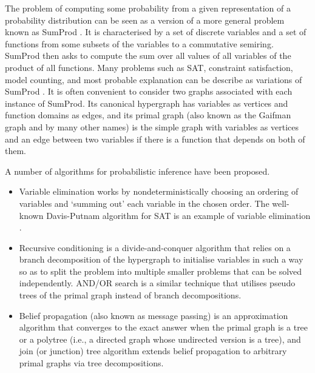 \documentclass{article}
\begin{document}
The problem of computing some probability from a given representation of a
probability distribution can be seen as a version of a more general problem
known as SumProd
\cite{DBLP:journals/jair/BacchusDP09,DBLP:journals/ai/Dechter99}. It is
characterised by a set of discrete variables and a set of functions from some
subsets of the variables to a commutative semiring. SumProd then asks to compute
the sum over all values of all variables of the product of all functions. Many
problems such as SAT, constraint satisfaction, model counting, and most probable
explanation can be describe as variations of SumProd
\cite{DBLP:journals/jair/BacchusDP09,DBLP:journals/ijar/BelleR20,DBLP:journals/ai/Dechter99,DBLP:journals/japll/KimmigBR17}.
It is often convenient to consider two graphs associated with each instance of
SumProd. Its canonical hypergraph has variables as vertices and function domains
as edges, and its primal graph (also known as the Gaifman graph and by many
other names) is the simple graph with variables as vertices and an edge
between two variables if there is a function that depends on both of them.

A number of algorithms for probabilistic inference have been proposed.
\begin{itemize}
\item Variable elimination \cite{DBLP:journals/ai/Dechter99} works by
  nondeterministically choosing an ordering of variables and `summing out' each
  variable in the chosen order. The well-known
  Davis-Putnam algorithm \cite{DBLP:journals/jacm/DavisP60} for SAT is an
  example of variable elimination \cite{DBLP:journals/jair/BacchusDP09}.
\item Recursive conditioning \cite{DBLP:journals/ai/Darwiche01} is a
  divide-and-conquer algorithm that relies on a branch decomposition of the
  hypergraph to initialise variables in such a way so as to split the problem
  into multiple smaller problems that can be solved independently. AND/OR search
  \cite{DBLP:journals/ai/DechterM07,nilsson1980principles} is a similar
  technique that utilises pseudo trees of the primal graph instead of branch
  decompositions.
\item Belief propagation (also known as message passing)
  \cite{DBLP:conf/aaai/Pearl82} is an approximation algorithm that converges to
  the exact answer when the primal graph is a tree or a polytree (i.e., a
  directed graph whose undirected version is a tree), and join (or junction)
  tree algorithm \cite{lauritzen1988local} extends belief propagation to
  arbitrary primal graphs via tree decompositions.
\end{itemize}
\end{document}
